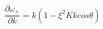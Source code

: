 \begin{equation}
\frac{{\partial}{\omega}_{+}}{{\partial}k}= k(1-{\xi}^{2}\dot{K}k cos{\theta})
\label{37}
\end{equation}

